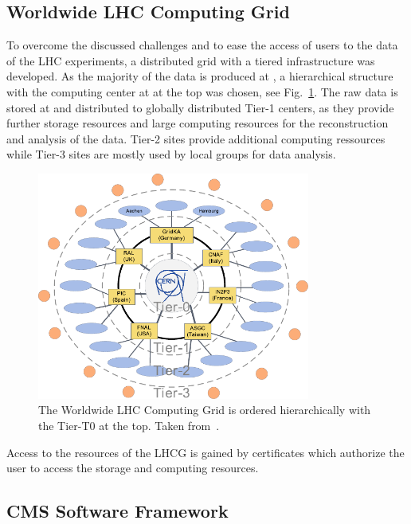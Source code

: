 \subsection{Worldwide LHC Computing Grid}

To overcome the discussed challenges and to ease the access of users to the data of
the LHC experiments, a distributed grid with a tiered infrastructure was
developed. As the majority of the data is produced at \CERN, a hierarchical
structure with the computing center at \CERN at the top was
chosen, see Fig.~\ref{fig:lhc_tier_structure}. The raw data is stored at \CERN
and distributed to globally distributed Tier-1 centers, as they provide further
storage resources and large computing resources for the reconstruction and
analysis of the data. Tier-2 sites provide additional computing ressources while
Tier-3 sites are mostly used by local groups for data analysis.

\begin{figure}[htp]
    \centering
    \includegraphics[width=0.8\textwidth]{figures/experimental_setup/lhcg.pdf}\hfill
    \caption[Tiered structure of the worldwide LHC Computing Grid]{The Worldwide
        LHC Computing Grid is ordered hierarchically with the \CERN Tier-T0 at the top. Taken
        from~\cite{Stober:2012abc}.}
    \label{fig:lhc_tier_structure}
\end{figure}

Access to the resources of the LHCG is gained by certificates which authorize
the user to access the storage and computing resources.


\subsection{CMS Software Framework}

